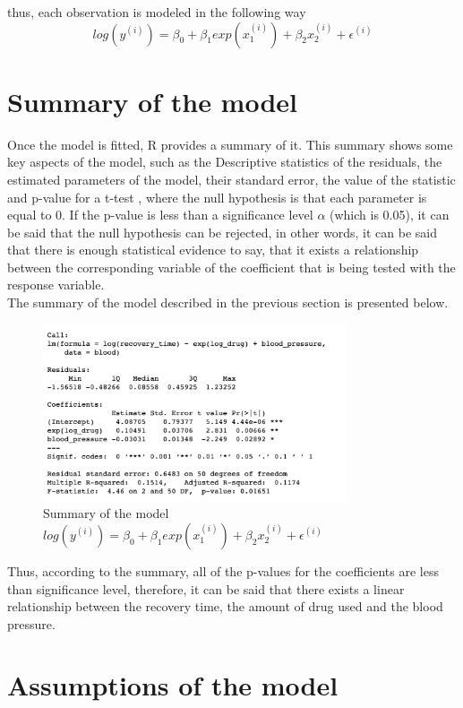 \documentclass{article}
\begin{document}
thus, each observation is modeled in the following way 
$$log(y^{(i)}) = \beta_0 + \beta_1exp(x_1^{(i)})+ \beta_2x_2^{(i)} + \epsilon^{(i)}   $$


\section{Summary of the model}

Once the model is fitted, R provides a summary of it. This summary shows some key aspects of the model, such as the Descriptive statistics of the residuals, the estimated parameters of the model, their standard error, the value of the statistic and p-value for a t-test , where the null hypothesis is that each parameter is equal to 0. If the p-value is less than a significance level $\alpha$ (which is 0.05), it can be said that the null hypothesis can be rejected, in other words, it can be said that there is enough statistical evidence to say, that it exists a relationship between the corresponding variable of the coefficient that is being tested with the response variable. \\
The summary of the model described in the previous section is presented below.
 

\begin{figure}[H]
\centering
\includegraphics[width=0.8\textwidth]{sm.png}
\caption{\label{fig:frog} Summary of the model $log(y^{(i)}) = \beta_0 + \beta_1exp(x_1^{(i)})+ \beta_2x_2^{(i)} + \epsilon^{(i)}   $}
\end{figure}

Thus, according to the summary, all of the p-values for the coefficients are less than significance level, therefore, it can be said that there exists a linear relationship between the recovery time, the amount of drug used and the blood pressure. 

\section{Assumptions of the model}
\end{document}
